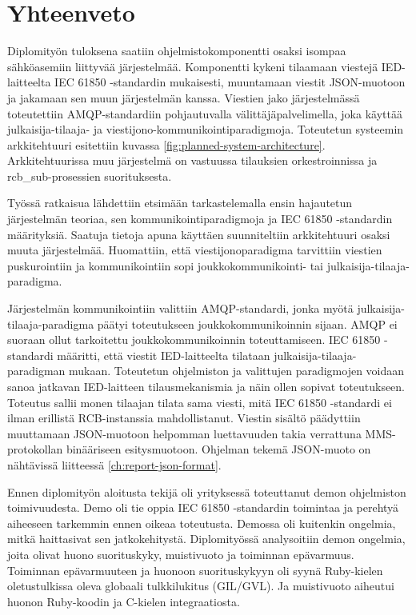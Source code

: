 \chapter{Yhteenveto}
\label{ch:yhteenveto}
Diplomityön tuloksena saatiin ohjelmistokomponentti osaksi isompaa sähköasemiin liittyvää järjestelmää. Komponentti kykeni tilaamaan viestejä IED-laitteelta IEC 61850 -stan\-dar\-din mukaisesti, muuntamaan viestit JSON-muotoon ja jakamaan sen muun järjestelmän kanssa. Viestien jako järjestelmässä toteutettiin AMQP-standardiin pohjautuvalla välittäjäpalvelimella, joka käyttää julkaisija-tilaaja- ja viestijono-kom\-mu\-ni\-koin\-ti\-pa\-ra\-dig\-mo\-ja. Toteutetun systeemin arkkitehtuuri esitettiin kuvassa \ref{fig:planned-system-architecture}. Arkkitehtuurissa muu järjestelmä on vastuussa tilauksien orkestroinnissa ja rcb\_sub-prosessien suorituksesta.

Työssä ratkaisua lähdettiin etsimään tarkastelemalla ensin hajautetun järjestelmän teoriaa, sen kommunikointiparadigmoja ja IEC 61850 -standardin määrityksiä. Saatuja tietoja apuna käyttäen suunniteltiin arkkitehtuuri osaksi muuta järjestelmää. Huomattiin, että viestijonoparadigma tarvittiin viestien puskurointiin ja kommunikointiin sopi jouk\-ko\-kom\-mu\-ni\-koin\-ti- tai julkaisija-tilaaja-paradigma.

Järjestelmän kommunikointiin valittiin AMQP-standardi, jonka myötä julkaisija-tilaaja-paradigma päätyi toteutukseen joukkokommunikoinnin sijaan. AMQP ei suoraan ollut tarkoitettu joukkokommunikoinnin toteuttamiseen. IEC 61850 -standardi määritti, että viestit IED-laitteelta tilataan julkaisija-tilaaja-paradigman mukaan. Toteutetun ohjelmiston ja valittujen paradigmojen voidaan sanoa jatkavan IED-laitteen tilausmekanismia ja näin ollen sopivat toteutukseen. Toteutus sallii monen tilaajan tilata sama viesti, mitä IEC 61850 -standardi ei ilman erillistä RCB-instanssia mahdollistanut. Viestin sisältö päädyttiin muuttamaan JSON-muotoon helpomman luettavuuden takia verrattuna MMS-protokollan binääriseen esitysmuotoon. Ohjelman tekemä JSON-muoto on nähtävissä liitteessä \ref{ch:report-json-format}.

Ennen diplomityön aloitusta tekijä oli yrityksessä toteuttanut demon ohjelmiston toimivuudesta. Demo oli tie oppia IEC 61850 -standardin toimintaa ja perehtyä aiheeseen tarkemmin ennen oikeaa toteutusta. Demossa oli kuitenkin ongelmia, mitkä haittasivat sen jatkokehitystä. Diplomityössä analysoitiin demon ongelmia, joita olivat huono suorituskyky, muistivuoto ja toiminnan epävarmuus. Toiminnan epävarmuuteen ja huonoon suorituskykyyn oli syynä Ruby-kielen oletustulkissa oleva globaali tulkkilukitus (GIL/GVL). Ja muistivuoto aiheutui huonon Ruby-koodin ja C-kielen integraatiosta.

